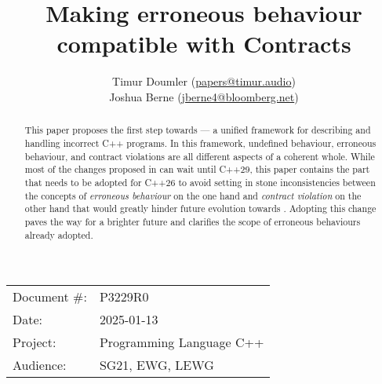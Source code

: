 \title{Making erroneous behaviour compatible with Contracts}
\author{
Timur Doumler \small(\href{mailto:papers@timur.audio}{papers@timur.audio}) \\
Joshua Berne \small(\href{mailto:jberne4@bloomberg.net}{jberne4@bloomberg.net}) \\
}
\date{}
\maketitle

\begin{tabular}{ll}
Document \#: & P3229R0 \\
Date: &2025-01-13 \\
Project: & Programming Language C++ \\
Audience: & SG21, EWG, LEWG
\end{tabular}

\begin{abstract}
This paper proposes the first step towards \cite{P3100R1} --- a unified framework for describing and handling incorrect C++ programs. In this framework, undefined behaviour, erroneous behaviour, and contract violations are all different aspects of a coherent whole. While most of the changes proposed in \cite{P3100R1} can wait until C++29, this paper contains the part that needs to be adopted for C++26 to avoid setting in stone inconsistencies between the concepts of \emph{erroneous behaviour} on the one hand and \emph{contract violation} on the other hand that would greatly hinder future evolution towards \cite{P3100R1}.  Adopting this change paves the way for a brighter future and clarifies the scope of erroneous behaviours already adopted.
\end{abstract}





